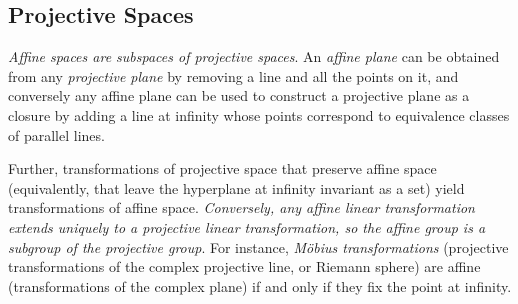 \documentclass[aps,preprint]{revtex4}%
\begin{document}
\subsection{Projective Spaces}

\emph{Affine spaces are subspaces of projective spaces}. An \emph{affine
plane} can be obtained from any \emph{projective plane} by removing a line and
all the points on it, and conversely any affine plane can be used to construct
a projective plane as a closure by adding a line at infinity whose points
correspond to equivalence classes of parallel lines.

Further, transformations of projective space that preserve affine space
(equivalently, that leave the hyperplane at infinity invariant as a set) yield
transformations of affine space. \emph{Conversely, any affine linear
transformation extends uniquely to a projective linear transformation, so the
affine group is a subgroup of the projective group}. For instance,
\emph{M\"{o}bius transformations} (projective transformations of the complex
projective line, or Riemann sphere) are affine (transformations of the complex
plane) if and only if they fix the point at infinity.
\end{document}
